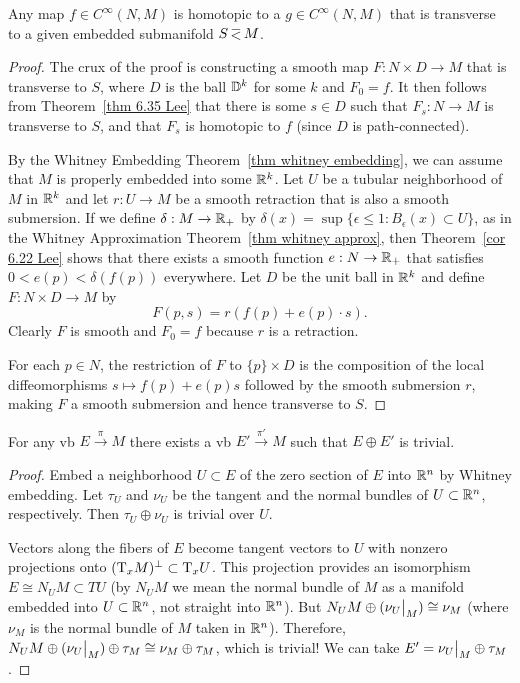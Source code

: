 \begin{thm}\label{transverse homotopy thm}
Any map $f\in C^\infty(N,M)$ is homotopic to a $g\in C^\infty(N,M)$ that is transverse to a given embedded submanifold $S\emb M$.
\end{thm}
\begin{proof}
The crux of the proof is constructing a smooth map $F:N\times D\to M$ that is transverse to $S$, where $D$ is the ball $\mathbb{D}^k$ for some $k$ and $F_0=f$. It then follows from Theorem~\ref{thm 6.35 Lee} that there is some $s\in D$ such that $F_s:N\to M$ is transverse to $S$, and that $F_s$ is homotopic to $f$ (since $D$ is path-connected).

By the Whitney Embedding Theorem~\ref{thm whitney embedding}, we can assume that $M$ is properly embedded into some $\mathbb{R}^k$. Let $U$ be a tubular neighborhood of $M$ in $\mathbb{R}^k$ and let $r:U\to M$ be a smooth retraction that is also a smooth submersion. If we define $\delta:M\to \mathbb{R}_+$ by $\delta(x)=\sup\{\epsilon\leq 1:B_\epsilon(x)\subset U\}$, as in the Whitney Approximation Theorem~\ref{thm whitney approx}, then Theorem~\ref{cor 6.22 Lee} shows that there exists a smooth function $e:N\to \mathbb{R}_+$ that satisfies $0<e(p)<\delta(f(p))$ everywhere. Let $D$ be the unit ball in $\mathbb{R}^k$ and define $F:N\times D\to M$ by
\[F(p,s)=r(f(p)+e(p)\cdot s).\]
Clearly  $F$ is smooth and $F_0=f$ because $r$ is a retraction. 

For each $p\in N$, the restriction of $F$ to $\{p\}\times D$ is the composition of the local diffeomorphisms $s\mapsto f(p)+e(p)s$ followed by the smooth submersion $r$, making $F$ a smooth submersion and hence transverse to $S$.
\end{proof}


\begin{thm}\label{every VB is summand of trivial VB}
    For any \gls{vb} $E\overset{\pi}{\to} M$ there exists a \gls{vb} $E'\overset{\pi'}{\to} M$ such that $E\oplus E'$ is trivial.
\end{thm}
\begin{proof}
    Embed a neighborhood $U\subset E$ of the zero section of $E$ into $\mathbb{R}^n$ by Whitney embedding. Let $\tau_U$ and $\nu_U$ be the tangent and the normal bundles of $U\subset \mathbb{R}^n$, respectively. Then $\tau_U\oplus \nu_U$ is trivial over $U$.
    
    Vectors along the fibers of $E$ become tangent vectors to $U$ with nonzero projections onto $(\mathrm{T}_x M)^\perp\subset \mathrm{T}_x U$. This projection provides an isomorphism $E\cong N_U M\subset TU$ (by $N_U M$ we mean the normal bundle of $M$ as a manifold embedded into $U\subset \mathbb{R}^n$, not straight into $\mathbb{R}^n$). But $N_U M\oplus (\restr{\nu_U}{M})\cong \nu_M$ (where $\nu_M$ is the normal bundle of $M$ taken in $\mathbb{R}^n$). Therefore, $N_U M\oplus (\restr{\nu_U}{M})\oplus \tau_M\cong \nu_M\oplus \tau_M $, which is trivial! We can take $E'=\restr{\nu_U}{M}\oplus \tau_M$.
\end{proof}

